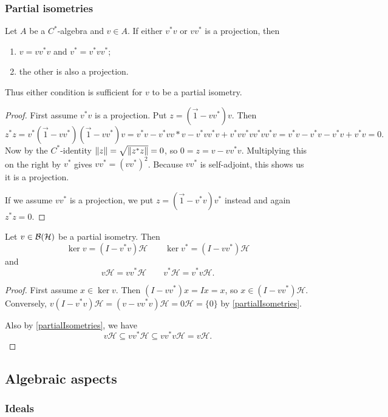 \subsubsection{Partial isometries}
\begin{lemma} \label{partialIsometries}
Let $A$ be a $C^*$-algebra and $v\in A$.
If either $v^*v$ or $vv^*$ is a projection, then
\begin{enumerate}
\item $v=vv^*v$ and $v^* = v^*vv^*$;
\item the other is also a projection.
\end{enumerate}
Thus either condition is sufficient for $v$ to be a partial isometry.
\end{lemma}
\begin{proof}
First assume $v^*v$ is a projection. Put $z = (\vec{1}- vv^*)v$. Then
\[ z^*z = v^*(\vec{1}-vv^*)(\vec{1}-vv^*)v = v^*v - v^*vv*v -v^*vv^*v + v^*vv^*vv^*vv^*v = v^*v - v^*v - v^*v + v^*v = 0. \]
Now by the $C^*$-identity $\lVert z\rVert = \sqrt{\lVert z^*z\rVert} = 0$, so $0=z= v - vv^*v$. Multiplying this on the right by $v^*$ gives $vv^* = (vv^*)^2$. Because $vv^*$ is self-adjoint, this shows us it is a projection.

If we assume $vv^*$ is a projection, we put $z = (\vec{1}- v^*v)v^*$ instead and again $z^*z = 0$.
\end{proof}

\begin{lemma}
Let $v\in\operatorname{\mathcal{B}}(\mathcal{H})$ be a partial isometry. Then
\[\ker v = (I - v^*v)\mathcal{H} \qquad \ker v^* = (I - vv^*)\mathcal{H}\]
and
\[ v\mathcal{H} = vv^*\mathcal{H} \qquad v^*\mathcal{H} = v^*v\mathcal{H}. \]
\end{lemma}
\begin{proof}
First assume $x\in\ker v$. Then $(I-vv^*)x = Ix = x$, so $x\in (I - vv^*)\mathcal{H}$. Conversely, $v(I-v^*v)\mathcal{H} = (v-vv^*v)\mathcal{H} = 0\mathcal{H} = \{0\}$ by \ref{partialIsometries}.

Also by \ref{partialIsometries}, we have
\[ v\mathcal{H} \subseteq vv^*\mathcal{H} \subseteq vv^*v\mathcal{H} = v\mathcal{H}. \]
\end{proof}

\subsection{Algebraic aspects}
\subsubsection{Ideals}

